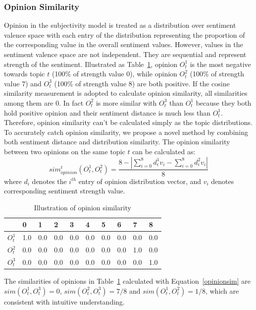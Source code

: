 \documentclass{acm_proc_article-sp}
\begin{document}
\subsubsection{Opinion Similarity}
\label{opsim}

Opinion in the subjectivity model is treated  as a distribution over sentiment valence space with each entry of the distribution representing the proportion of the corresponding value in the overall sentiment values. 
However, values in the sentiment valence space are not independent. 
They are sequential and represent strength of the sentiment. Illustrated as Table~\ref{tab1}, opinion $ O_{t}^{1} $ is the most negative towards topic $ t $ (100\% of strength value 0), while opinion $ O_{t}^{2} $ (100\% of strength value 7) and $ O_{t}^{3} $ (100\% of strength value 8) are both positive.
If the cosine similarity measurement is adopted to calculate opinion similarity, all similarities among them are 0.
In fact $ O_{t}^{2} $ is more similar with $ O_{t}^{3} $ than $O_{t}^{1} $ because they both hold positive opinion and their sentiment distance is much less than $ O_{t}^{1} $.  
Therefore, opinion similarity can't be calculated simply as the topic distributions. 
To accurately catch opinion similarity, we propose a novel method by combining both sentiment distance and distribution similarity.
The opinion similarity between two opinions on the same topic $ t $ can be calculated as: 
\begin{equation}
\label{opinionsim}
sim_{opinion}^{t}(O_{t}^{1},O_{t}^{2})=\dfrac{8-|\sum_{i=0}^{8}d_{i}^{1}v_{i}-\sum_{i=0}^{8}d_{i}^{2}v_{i}|}{8}
\end{equation}
where $ d_{i} $ denotes the $ i^{th} $ entry of opinion distribution vector, and $ v_{i} $ denotes corresponding sentiment strength value. 
\begin{table}[b]
\scriptsize
\centering
\caption{Illustration of opinion similarity}
\label{tab1}
\begin{tabular}{|l|l|l|l|l|l|l|l|l|l|}
\hline
 & 0 & 1& 2 & 3 & 4 & 5 & 6 & 7 & 8 \\
\hline
$O_{t}^{1}$ & 1.0 & 0.0 & 0.0 & 0.0 & 0.0 & 0.0 & 0.0 & 0.0 & 0.0 \\
\hline
$O_{t}^{2}$ & 0.0 & 0.0 & 0.0 & 0.0 & 0.0 & 0.0 & 0.0 & 1.0 & 0.0 \\
\hline
$O_{t}^{3}$ & 0.0 & 0.0 & 0.0 & 0.0 & 0.0 & 0.0 & 0.0 & 0.0 & 1.0 \\
\hline
\end{tabular}
\end{table} 
The similarities of opinions in Table~\ref{tab1} calculated with Equation~\ref{opinionsim} are $ sim(O_{t}^{1},O_{t}^{3})=0 $, $ sim(O_{t}^{2},O_{t}^{3})=7/8 $ and $ sim(O_{t}^{1},O_{t}^{2})=1/8 $, which are consistent with intuitive understanding. 
\end{document}

